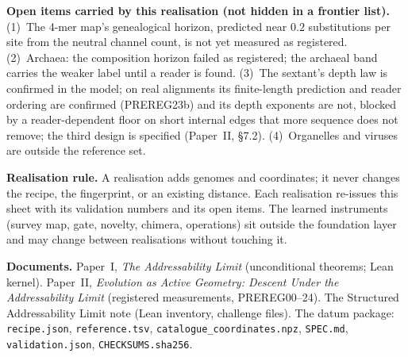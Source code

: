 \documentclass[10pt]{article}
\begin{document}
\textbf{Open items carried by this realisation (not hidden in a frontier list).} (1)~The 4-mer map's genealogical horizon, predicted near $0.2$ substitutions per site from the neutral channel count, is not yet measured as registered. (2)~Archaea: the composition horizon failed as registered; the archaeal band carries the weaker label until a reader is found. (3)~The sextant's depth law is confirmed in the model; on real alignments its finite-length prediction and reader ordering are confirmed (PREREG23b) and its depth exponents are not, blocked by a reader-dependent floor on short internal edges that more sequence does not remove; the third design is specified (Paper~II, \S7.2). (4)~Organelles and viruses are outside the reference set.

\textbf{Realisation rule.} A realisation adds genomes and coordinates; it never changes the recipe, the fingerprint, or an existing distance. Each realisation re-issues this sheet with its validation numbers and its open items. The learned instruments (survey map, gate, novelty, chimera, operations) sit outside the foundation layer and may change between realisations without touching it.

\textbf{Documents.} Paper~I, \emph{The Addressability Limit} (unconditional theorems; Lean kernel). Paper~II, \emph{Evolution as Active Geometry: Descent Under the Addressability Limit} (registered measurements, PREREG00--24). The Structured Addressability Limit note (Lean inventory, challenge files). The datum package: \texttt{recipe.json}, \texttt{reference.tsv}, \texttt{catalogue\_\allowbreak{}coordinates.npz}, \texttt{SPEC.md}, \texttt{validation.json}, \texttt{CHECKSUMS.sha256}.
\end{document}
